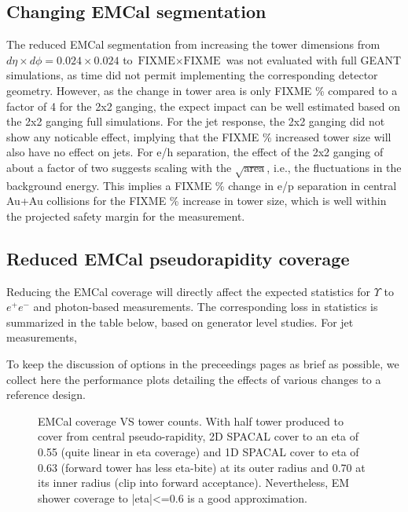 \subsection{Changing EMCal segmentation}
The reduced EMCal segmentation from increasing the tower dimensions from $d\eta \times d\phi = 0.024 \times 0.024$ to 
$\mbox{FIXME} \times \mbox{FIXME}$ was not evaluated with full GEANT simulations, as time did not permit implementing
the corresponding detector geometry. However, as the change in tower area is only FIXME \% compared to a factor of 4 for 
the 2x2 ganging, the expect impact can be well estimated based on the 2x2 ganging full simulations. For the 
jet response, the 2x2 ganging did not show any noticable effect, implying that the FIXME \% increased tower size 
will also have no effect on jets. For e/h separation, the effect of the 2x2 ganging of about a factor of two suggests 
scaling with the $\sqrt{\mbox{area}}$, i.e., the fluctuations in the background energy. This implies a FIXME \% change
in e/p separation in central Au+Au collisions for the FIXME \% increase in tower size, which is well within the projected safety margin for the 
measurement.

\subsection{Reduced EMCal pseudorapidity coverage}
Reducing the EMCal coverage will directly affect the expected statistics for $\Upsilon$ to $e^+ e^-$ and photon-based measurements. The 
corresponding loss in statistics is summarized in the table below, based on generator level studies. For jet measurements, 


To keep the discussion of options in the preceedings pages as brief as
possible, we collect here the performance plots detailing the effects
of various changes to a reference design.

\begin{figure}[hbt]
  \centering
  \caption{EMCal coverage VS tower counts. With half tower produced to cover from central pseudo-rapidity, 2D SPACAL cover to an eta of 0.55 (quite linear in eta coverage) and 1D SPACAL cover to eta of 0.63 (forward tower has less eta-bite) at its outer radius and 0.70 at its inner radius (clip into forward acceptance). Nevertheless, EM shower coverage to |eta|<=0.6 is a good approximation.}
  \label{fig:eta_tower_fraction}
\end{figure}

